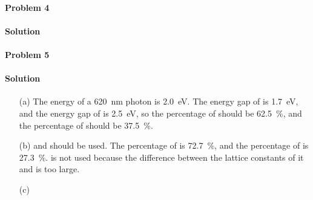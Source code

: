 \documentclass[hyperref, a4paper]{article}
\begin{document}
\paragraph{Problem 4}

\paragraph{Solution} 

\paragraph{Problem 5}

\paragraph{Solution} \begin{itemize}
\item[(a)] The energy of a \SI{620}{nm} photon is \SI{2.0}{eV}.
The energy gap of  is \SI{1.7}{eV},
and the energy gap of  is \SI{2.5}{eV},
so the percentage of  should be \SI{62.5}{\percent},
and the percentage of  should be \SI{37.5}{\percent}.

\item[(b)]  and  should be used.
The percentage of  is \SI{72.7}{\percent}, 
and the percentage of  is \SI{27.3}{\percent}.
 is not used because the difference between the lattice constants of it and  is too large.

\item[(c)] 
\end{itemize}
\end{document}
